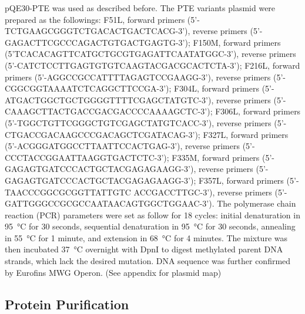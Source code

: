 \begin{refsection}
pQE30-PTE was used as described before\cite{Yang2014a}. The PTE variants plasmid
were prepared as the followings: F51L, forward primers
(5’-TCTGAAGCGGGTCTGACACTGACTCACG-3'), reverse primers
(5’-GAGACTTCGCCCAGACTGTGACTGAGTG-3’); F150M, forward primers
(5’TCACACAGTTCATGCTGCGTGAGATTCAATATGGC-3'), reverse primers
(5’-CATCTCCTTGAGTGTGTCAAGTACGACGCACTCTA-3’); F216L, forward primers
(5’-AGGCCGCCATTTTAGAGTCCGAAGG-3'), reverse primers
(5’-CGGCGGTAAAATCTCAGGCTTCCGA-3’); F304L, forward primers
(5'-ATGACTGGCTGCTGGGGTTTTCGAGCTATGTC-3'), reverse primers
(5’-CAAAGCTTACTGACCGACGACCCCAAAAGCTC-3’); F306L, forward primers
(5’-TGGCTGTTCGGGCTGTCGAGCTATGTCACC-3'), reverse primers
(5’-CTGACCGACAAGCCCGACAGCTCGATACAG-3’); F327L, forward primers
(5’-ACGGGATGGCCTTAATTCCACTGAG-3'), reverse primers
(5’-CCCTACCGGAATTAAGGTGACTCTC-3’); F335M, forward primers
(5’-GAGAGTGATCCCACTGCTACGAGAGAAGG-3'), reverse primers
(5’-GAGAGTGATCCCACTGCTACGAGAGAAGG-3’); F357L, forward primers
(5’-TAACCCGGCGCGGTTATTGTC ACCGACCTTGC-3'), reverse primers
(5’-GATTGGGCCGCGCCAATAACAGTGGCTGGAAC-3’). The polymerase chain reaction (PCR)
parameters were set as follow for 18 cycles: initial denaturation in
\SI{95}{\celsius} for 30 seconds, sequential denaturation in \SI{95}{\celsius}
for 30 seconds, annealing in \SI{55}{\celsius} for 1 minute, and extension in
\SI{68}{\celsius} for 4 minutes. The mixture was then incubated
\SI{37}{\celsius} overnight with DpnI to digest methylated parent DNA strands,
which lack the desired mutation. DNA sequence was further confirmed by Eurofins
MWG Operon. (See appendix for plasmid map)

\subsection{Protein Purification}


\end{refsection}

